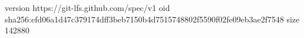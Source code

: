version https://git-lfs.github.com/spec/v1
oid sha256:efd06a1d47c379174dff3beb7150b4d7515748802f5590f02fe09eb3ae2f7548
size 142880
